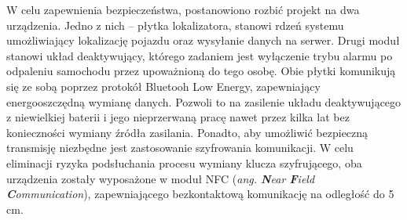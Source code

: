 W celu zapewnienia bezpieczeństwa, postanowiono rozbić projekt na dwa urządzenia. Jedno z nich – płytka lokalizatora, stanowi rdzeń systemu umożliwiający lokalizację pojazdu oraz wysyłanie danych na serwer. Drugi moduł stanowi układ deaktywujący, którego zadaniem jest wyłączenie trybu alarmu po odpaleniu samochodu przez upoważnioną do tego osobę. Obie płytki komunikują się ze sobą poprzez protokół Bluetooh Low Energy, zapewniający energooszczędną wymianę danych. Pozwoli to na zasilenie układu deaktywującego z niewielkiej baterii i jego nieprzerwaną pracę nawet przez kilka lat bez konieczności wymiany źródła zasilania. 
Ponadto, aby umożliwić  bezpieczną transmisję niezbędne jest zastosowanie szyfrowania komunikacji. W celu eliminacji ryzyka podsłuchania procesu wymiany klucza szyfrującego, oba urządzenia zostały wyposażone w moduł NFC (\textit{ang. \textbf{N}ear \textbf{F}ield \textbf{C}ommunication}), zapewniającego bezkontaktową komunikację na odległość do 5 cm.